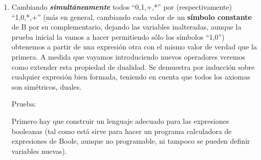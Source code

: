 \begin{enumerate}
\begin{enumerate}
\begin{enumerate}
      \begin{enumerate}
      \def\labelenumiv{\arabic{enumiv}.}
      \item
        Cambiando \emph{\textbf{simultáneamente}} todos ``0,1,+,*'' por
        (respectivamente) ``1,0,*,+'' (más en general, cambiando cada
        valor de un \textbf{símbolo constante} de B por su
        complementario, dejando las variables inalteradas, aunque la
        prueba inicial la vamos a hacer permitiendo sólo los símbolos
        ``1,0'') obtenemos a partir de una ex\-presión otra con el mismo
        valor de verdad que la primera. A medida que vaya\-mos
        introduciendo nuevos operadores veremos como extender esta
        propiedad de dualidad. Se demuestra por inducción sobre
        cualquier expresión bien formada, teniendo en cuenta que todos
        los axiomas son simétricos, duales.

        Prueba:

        Primero hay que construir un lenguaje adecuado para las
        expresiones booleanas (tal como está sirve para hacer un
        programa calculadora de expresiones de Boo\-le, aunque no
        programable, ni tampoco se pueden definir variables nuevas).


\end{enumerate}
\end{enumerate}
\end{enumerate}
\end{enumerate}
